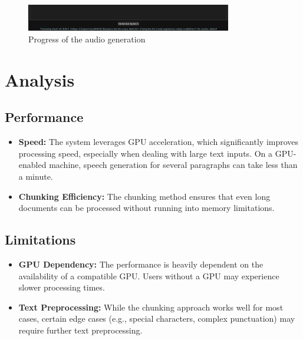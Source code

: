 \documentclass[12pt, a4paper]{article}
\begin{document}
\begin{figure}[h!]
\centering
\includegraphics[width=0.8\textwidth]{figures/status.png}
\caption{Progress of the audio generation}
\label{fig:test_results}
\end{figure}


\section{Analysis}

\subsection{Performance}

\begin{itemize}

\item \textbf{Speed:} The system leverages GPU acceleration, which significantly improves processing speed, especially when dealing with large text inputs. On a GPU-enabled machine, speech generation for several paragraphs can take less than a minute.

\item \textbf{Chunking Efficiency:} The chunking method ensures that even long documents can be processed without running into memory limitations.

\end{itemize}


\subsection{Limitations}

\begin{itemize}

\item \textbf{GPU Dependency:} The performance is heavily dependent on the availability of a compatible GPU. Users without a GPU may experience slower processing times.

\item \textbf{Text Preprocessing:} While the chunking approach works well for most cases, certain edge cases (e.g., special characters, complex punctuation) may require further text preprocessing.

\end{itemize}
\end{document}
